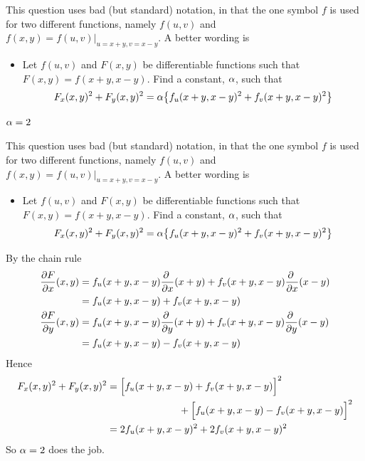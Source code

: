 \begin{hint}
This question uses bad (but standard) notation, in that the one symbol $f$
is used for two different functions, namely $f(u,v)$ and
$f(x,y)=f(u,v)\big|_{u=x+y,v=x-y}$. A better wording is
\begin{itemize}
\item[]
Let $f(u,v)$ and $F(x,y)$ be differentiable functions such that
$F(x,y)=f(x+y,x-y)$.  Find a constant, $\alpha$, such that
\begin{equation*}
F_x(x,y)^2+F_y(x,y)^2=\alpha\big\{f_u(x+y,x-y)^2+f_v(x+y,x-y)^2\big\}
\end{equation*}
\end{itemize}
\end{hint}

\begin{answer}
$\alpha=2$
\end{answer}

\begin{solution}
This question uses bad (but standard) notation, in that the one symbol $f$
is used for two different functions, namely $f(u,v)$ and
$f(x,y)=f(u,v)\big|_{u=x+y,v=x-y}$. A better wording is
\begin{itemize}
\item[]
Let $f(u,v)$ and $F(x,y)$ be differentiable functions such that
$F(x,y)=f(x+y,x-y)$.  Find a constant, $\alpha$, such that
\begin{equation*}
F_x(x,y)^2+F_y(x,y)^2=\alpha\big\{f_u(x+y,x-y)^2+f_v(x+y,x-y)^2\big\}
\end{equation*}
\end{itemize}
By the chain rule
\begin{align*}
\pdiff{F}{x}(x,y)
&=f_u(x+y,x-y)\pdiff{}{x}(x+y)
+f_v(x+y,x-y)\pdiff{}{x}(x-y) \\
&=f_u(x+y,x-y)+f_v(x+y,x-y)\\
\pdiff{F}{y}(x,y)
&=f_u(x+y,x-y)\pdiff{}{y}(x+y)
+f_v(x+y,x-y)\pdiff{}{y}(x-y) \\
&=f_u(x+y,x-y)-f_v(x+y,x-y)
\end{align*}
Hence
\begin{align*}
F_x(x,y)^2+F_y(x,y)^2
&=\Big[f_u(x+y,x-y)+f_v(x+y,x-y)\Big]^2 \\
&\hskip1in +\Big[f_u(x+y,x-y)-f_v(x+y,x-y)\Big]^2\\
&=2f_u(x+y,x-y)^2+2f_v(x+y,x-y)^2
\end{align*}
So $\alpha=2$ does the job.
\end{solution}

